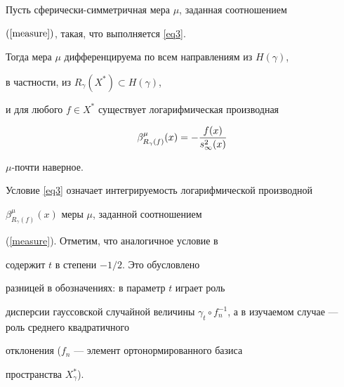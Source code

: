\begin{lem}


Пусть сферически-симметричная мера $\mu$, заданная соотношением


$(\ref{measure})$, такая, что выполняется \eqref{eq3}.




Тогда мера $\mu$ дифференцируема по всем направлениям из $H(\gamma)$,


в частности, из $R_\gamma(X^*)\subset H(\gamma)$,


и для любого $f\in X^*$ существует логарифмическая производная


\begin{equation}


\beta_{R_\gamma(f)}^{\mu}(x)=-\frac{f(x)}{\stwo}


\label{logpro}


\end{equation}


$\mu$-почти наверное.


\end{lem}








\begin{notenonum}


Условие \eqref{eq3} означает интегрируемость логарифмической производной


$\beta_{R_\gamma(f)}^{\mu}(x)$ меры $\mu$, заданной соотношением


(\ref{measure}). Отметим, что аналогичное условие в 


\cite{Norin} содержит $t$ в степени $-1/2$. Это обусловлено


разницей в обозначениях:  в \cite{Norin} параметр $t$ играет роль


дисперсии гауссовской случайной величины $\gamma_t\circ


f_n^{-1}$, а в изучаемом случае --- роль среднего квадратичного


отклонения ($f_n$ --- элемент ортонормированного базиса


пространства $X^*_\gamma$).


\end{notenonum}








